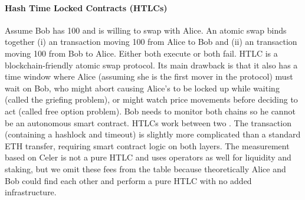 \paragraph*{Hash Time Locked Contracts (HTLCs)} Assume Bob has 100 \ethone and is willing to swap with Alice. An atomic swap binds together (i) an \layertwo transaction moving 100 \ethtwo from Alice to Bob and (ii) an \layerone transaction moving 100 \ethone from Bob to Alice. Either both execute or both fail. HTLC is a blockchain-friendly atomic swap protocol. Its main drawback is that it also has a time window where Alice (assuming she is the first mover in the protocol) must wait on Bob, who might abort causing Alice's \ethtwo to be locked up while waiting (called the griefing problem), or might watch price movements before deciding to act (called free option problem). Bob needs to monitor both chains so he cannot be an autonomous smart contract. HTLCs work between two \layertwos. The transaction (containing a hashlock and timeout) is slightly more complicated than a standard ETH transfer, requiring smart contract logic on both layers. The measurement based on Celer is not a pure HTLC and uses operators as well for liquidity and staking, but we omit these fees from the table because theoretically Alice and Bob could find each other and perform a pure HTLC with no added infrastructure. %

